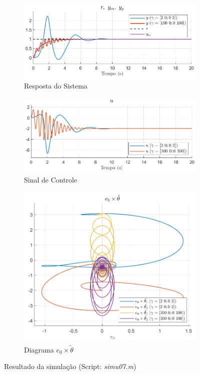 \documentclass[10pt]{article}
\begin{document}
\begin{figure}[h!]
    \begin{subfigure}[b]{0.3\textwidth}
        \centering
        \includegraphics[width=\textwidth]{img/fig07c.png}
        \caption{Resposta do Sistema}
    \end{subfigure}
    \begin{subfigure}[b]{0.3\textwidth}
        \centering
        \includegraphics[width=\textwidth]{img/fig07e.png}
        \caption{Sinal de Controle}
    \end{subfigure}

    \begin{subfigure}[b]{0.3\textwidth}
        \centering
        \includegraphics[width=\textwidth]{img/fig07d.png}
        \caption{Diagrama $e_0 \times \tilde{\theta}$}
    \end{subfigure}

    \caption{Resultado da simulação (Script: \textit{simu07.m})}
    \label{fig:sim7}
\end{figure}
\end{document}
